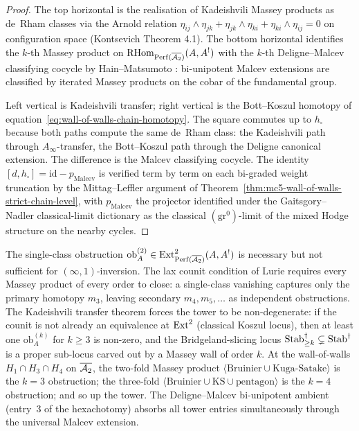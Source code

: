 \begin{proof}
The top horizontal is the realisation of Kadeishvili Massey products
as de~Rham classes via the Arnold relation
$\eta_{ij}\wedge\eta_{jk}+\eta_{jk}\wedge\eta_{ki}+\eta_{ki}\wedge
\eta_{ij}=0$ on configuration space
(Kontsevich \cite{Kontsevich2003LMP} Theorem 4.1). The bottom
horizontal identifies the $k$-th Massey product on
$\mathrm{RHom}_{\mathrm{Perf}(\overline{\mathcal{A}_2})}(A,A^!)$ with the $k$-th Deligne--Malcev
classifying cocycle by Hain--Matsumoto
\cite[Theorem~5.1]{HainMatsumoto2003JAMS}: bi-unipotent Malcev
extensions are classified by iterated Massey products on the cobar
of the fundamental group.

Left vertical is Kadeishvili transfer; right vertical is the
Bott--Koszul homotopy of
equation~\textup{\eqref{eq:wall-of-walls-chain-homotopy}}. The
square commutes up to $h_\square$ because both paths compute the
same de~Rham class: the Kadeishvili path through $A_\infty$-transfer,
the Bott--Koszul path through the Deligne canonical extension. The
difference is the Malcev classifying cocycle. The identity
$[d,h_\square]=\mathrm{id}-p_{\mathrm{Malcev}}$ is verified term by
term on each bi-graded weight truncation by the Mittag--Leffler
argument of
Theorem~\textup{\ref{thm:mc5-wall-of-walls-strict-chain-level}},
with $p_{\mathrm{Malcev}}$ the projector identified under the
Gaitsgory--Nadler classical-limit dictionary
\cite[]{GaitsgoryNadler2009} as the classical
$(\mathrm{gr}^0)$-limit of the mixed Hodge structure on the nearby
cycles.
\end{proof}

\begin{remark}[Higher-$k$ $\ExtOp$ requirement; insufficiency of
$k=2$]
\label{rem:mc5-higher-k-ext-requirement}
%
The single-class obstruction
$\mathrm{ob}^{(2)}_A\in\mathrm{Ext}^2_{\mathrm{Perf}(\overline{\mathcal{A}_2})}(A,A^!)$ is
necessary but not sufficient for $(\infty,1)$-inversion. The lax
counit condition of Lurie \cite[.7]{LurieHA}
requires every Massey product of every order to close: a
single-class vanishing captures only the primary homotopy $m_3$,
leaving secondary $m_4, m_5,\ldots$ as independent obstructions.
The Kadeishvili transfer theorem forces the tower to be
non-degenerate: if the counit is not already an equivalence at
$\mathrm{Ext}^2$ (classical Koszul locus), then at least one
$\mathrm{ob}^{(k)}_A$ for $k\ge 3$ is non-zero, and the
Bridgeland-slicing locus $\mathrm{Stab}^\dagger_{\ge k}\subsetneq
\mathrm{Stab}^\dagger$ is a proper sub-locus carved out by a Massey wall
of order $k$. At the wall-of-walls $H_1\cap H_3\cap H_4$ on
$\overline{\mathcal{A}_2}$, the two-fold Massey product
$\langle\mathrm{Bruinier}\cup\mathrm{Kuga\text{-}Satake}\rangle$ is
the $k=3$ obstruction; the three-fold
$\langle\mathrm{Bruinier}\cup\mathrm{KS}\cup\mathrm{pentagon}\rangle$
is the $k=4$ obstruction; and so up the tower. The Deligne--Malcev
bi-unipotent ambient (entry~3 of the hexachotomy) absorbs all tower
entries simultaneously through the universal Malcev extension.
\end{remark}

